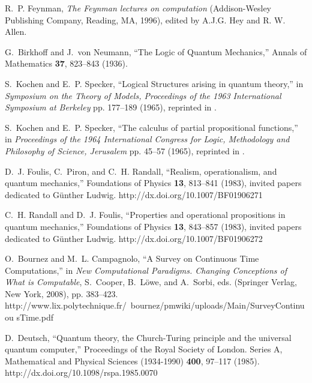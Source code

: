 \documentclass[prl,amsfonts,amsmath,showpacs,showkeys,preprint]{revtex4}
\begin{document}
\begin{thebibliography}{10}
R.~P. Feynman, {\em The Feynman lectures on computation\/} (Addison-Wesley
  Publishing Company, Reading, MA, 1996), edited by A.J.G. Hey and R. W. Allen.

G.~Birkhoff and J.~von Neumann, \enquote{The Logic of Quantum Mechanics,}
  Annals of Mathematics {\bf 37}, 823--843 (1936).

S.~Kochen and E.~P. Specker, \enquote{Logical Structures arising in quantum
  theory,} in {\em Symposium on the Theory of Models, Proceedings of the 1963
  International Symposium at Berkeley\/}  pp. 177--189 (1965), reprinted in
  \cite[pp. 209--221]{specker-ges}.

S.~Kochen and E.~P. Specker, \enquote{The calculus of partial propositional
  functions,} in {\em Proceedings of the 1964 International Congress for Logic,
  Methodology and Philosophy of Science, Jerusalem\/}  pp. 45--57 (1965),
  reprinted in \cite[pp. 222--234]{specker-ges}.

D.~J. Foulis, C.~Piron, and C.~H. Randall, \enquote{Realism, operationalism,
  and quantum mechanics,} Foundations of Physics {\bf 13}, 813--841 (1983),
  invited papers dedicated to {G}{\"{u}}nther {L}udwig.
\newline http://dx.doi.org/10.1007/BF01906271

C.~H. Randall and D.~J. Foulis, \enquote{Properties and operational
  propositions in quantum mechanics,} Foundations of Physics {\bf 13}, 843--857
  (1983), invited papers dedicated to {G}{\"{u}}nther {L}udwig.
\newline http://dx.doi.org/10.1007/BF01906272

O.~Bournez and M.~L. Campagnolo, \enquote{A Survey on Continuous Time
  Computations,} in {\em New Computational Paradigms. Changing Conceptions of
  What is Computable\/}, S.~Cooper, B.~L{\"o}we, and A.~Sorbi, eds.  (Springer
  Verlag, New York, 2008), pp. 383--423.
\newline
  http://www.lix.polytechnique.fr/~bournez/pmwiki/uploads/Main/SurveyContinuou%
sTime.pdf

D.~Deutsch, \enquote{Quantum theory, the {C}hurch-{T}uring principle and the
  universal quantum computer,} Proceedings of the Royal Society of London.
  Series A, Mathematical and Physical Sciences (1934-1990) {\bf 400}, 97--117
  (1985).
\newline http://dx.doi.org/10.1098/rspa.1985.0070


\end{thebibliography}
\end{document}
